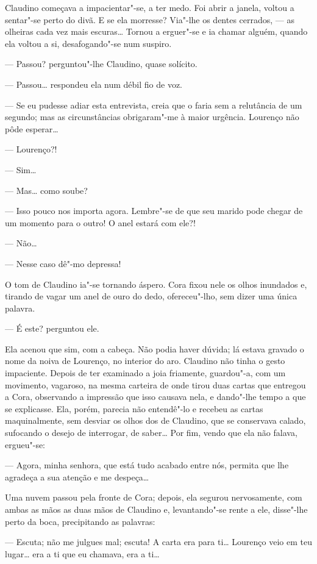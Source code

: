 Claudino começava a impacientar"-se, a ter medo. Foi abrir a janela,
voltou a sentar"-se perto do divã. E se ela morresse? Via"-lhe os dentes
cerrados, --- as olheiras cada vez mais escuras\ldots{} Tornou a erguer"-se e
ia chamar alguém, quando ela voltou a si, desafogando"-se num suspiro.

--- Passou? perguntou"-lhe Claudino, quase solícito.

--- Passou\ldots{} respondeu ela num débil fio de voz.

--- Se eu pudesse adiar esta entrevista, creia que o faria sem a
relutância de um segundo; mas as circunstâncias obrigaram"-me à maior
urgência. Lourenço não pôde esperar\ldots{}

--- Lourenço?!

--- Sim\ldots{}

--- Mas\ldots{} como soube?

--- Isso pouco nos importa agora. Lembre"-se de que seu marido pode
chegar de um momento para o outro! O anel estará com ele?!

--- Não\ldots{}

--- Nesse caso dê"-mo depressa!

O tom de Claudino ia"-se tornando áspero. Cora fixou nele os olhos
inundados e, tirando de vagar um anel de ouro do dedo, ofereceu"-lho, sem
dizer uma única palavra.

--- É este? perguntou ele.

Ela acenou que sim, com a cabeça. Não podia haver dúvida; lá estava
gravado o nome da noiva de Lourenço, no interior do aro. Claudino não
tinha o gesto impaciente. Depois de ter examinado a joia friamente,
guardou"-a, com um movimento, vagaroso, na mesma carteira de onde tirou
duas cartas que entregou a Cora, observando a impressão que isso causava
nela, e dando"-lhe tempo a que se explicasse. Ela, porém, parecia não
entendê"-lo e recebeu as cartas maquinalmente, sem desviar os olhos dos
de Claudino, que se conservava calado, sufocando o desejo de interrogar,
de saber\ldots{} Por fim, vendo que ela não falava, ergueu"-se:

--- Agora, minha senhora, que está tudo acabado entre nós, permita que
lhe agradeça a sua atenção e me despeça\ldots{}

Uma nuvem passou pela fronte de Cora; depois, ela segurou nervosamente,
com ambas as mãos as duas mãos de Claudino e, levantando"-se rente a ele,
disse"-lhe perto da boca, precipitando as palavras:

--- Escuta; não me julgues mal; escuta! A carta era para ti\ldots{} Lourenço
veio em teu lugar\ldots{} era a ti que eu chamava, era a ti\ldots{}

